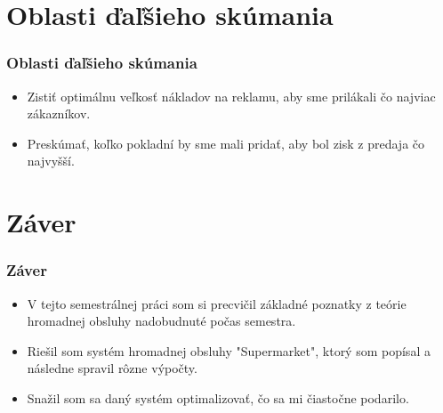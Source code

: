 \documentclass[hyperref={pdfpagelabels=false}]{beamer}
\begin{document}
\section{Oblasti ďaľšieho skúmania}
\begin{frame}
\frametitle{Oblasti ďaľšieho skúmania}
\begin{itemize}
\item Zistiť optimálnu veľkosť nákladov na reklamu, aby sme prilákali čo najviac zákazníkov.
\medskip
\item Preskúmať, koľko pokladní by sme mali pridať, aby bol zisk z predaja čo najvyšší.
\end{itemize}
\end{frame}

\section{Záver}
\begin{frame}
\frametitle{Záver}
\begin{itemize}
\item V tejto semestrálnej práci som si precvičil základné poznatky z teórie hromadnej obsluhy nadobudnuté počas semestra.
\medskip
\item Riešil som systém hromadnej obsluhy "Supermarket", ktorý som popísal a následne spravil rôzne výpočty.
\medskip
\item Snažil som sa daný systém optimalizovať, čo sa mi čiastočne podarilo.
\end{itemize}
\end{frame}
\end{document}
